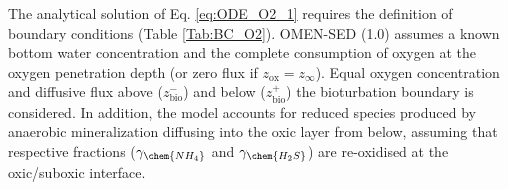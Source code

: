 \documentclass[gmd, manuscript]{copernicus}
\begin{document}
The analytical solution of Eq. \eqref{eq:ODE_O2_1} requires the definition of boundary conditions (Table \ref{Tab:BC_O2}). 
OMEN-SED (1.0) assumes a known bottom water concentration and the complete consumption of oxygen at the oxygen penetration depth (or zero flux if $z_{\mathrm{ox}}=z_\infty$). 
Equal oxygen concentration and diffusive flux above ($z_{\mathrm{bio}}^-$) and below ($z_{\mathrm{bio}}^+$) the bioturbation boundary is considered. 
In addition, the model accounts for reduced species produced by anaerobic mineralization diffusing into the oxic layer from below, 
assuming that respective fractions ($\gamma_{\chem{NH_4}}$ and $\gamma_{\chem{H_2S}}$) are re-oxidised at the oxic/suboxic interface. 
\end{document}
